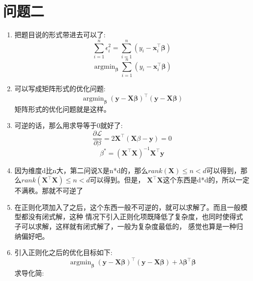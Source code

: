 \documentclass[answers]{exam}  %
\def \x \mathbf{x}
\def\x{{\boldsymbol{x}}}
\begin{document}
\section{问题二}
\begin{enumerate}[label=\alph*.] 
    \item 把题目说的形式带进去可以了:
    \begin{equation*}
        \sum_{i=1}^{n} \epsilon_i^2 = \sum_{i=1}^{n} (y_i - \x_i^\top \mathbf{\beta})
    \end{equation*}
    \begin{equation*}
        \mathop{\arg\min}_{\mathbf{\beta}} \sum_{i=1}^{n} (y_i - \x_i^\top \mathbf{\beta})
    \end{equation*}
    \item 可以写成矩阵形式的优化问题:
    \begin{equation*}
        \mathop{\arg\min}_{\mathbf{\beta}} (\mathbf{y} - \mathbf{X} \mathbf{\beta})^\top (\mathbf{y} - \mathbf{X} \mathbf{\beta})
    \end{equation*}
    矩阵形式的优化问题就是这样。
    \item 可逆的话，那么用求导等于0就好了:
    \begin{equation*}
        \frac{\partial \mathcal{L}}{\partial \beta} = 2\mathbf{X}^\top (\mathbf{X}\beta - \mathbf{y}) = 0
    \end{equation*}
    \begin{equation*}
        \beta^* = (\mathbf{X}^\top\mathbf{X})^{-1} \mathbf{X}^\top \mathbf{y}
    \end{equation*}
    \item 因为维度d比n大，第二问说X是n*d的，那么$rank(\mathbf{X})\leq n<d$可以得到，那么$rank(\mathbf{X}^\top \mathbf{X})\leq n<d$可以得到。但是，
    $\mathbf{X}^\top\mathbf{X}$这个东西是d*d的，所以一定不满秩。那就不可逆了
    \item 在正则化项加入了之后，这个东西一般不可逆的，就可以求解了。而且一般模型都没有闭式解，这种
    情况下引入正则化项既降低了复杂度，也同时使得式子可以求解，这样就有闭式解了，一般为复杂度最低的，
    感觉也算是一种归纳偏好吧。
    \item 引入正则化之后的优化目标如下:
    \begin{equation*}
        \mathop{\arg\min}_{\mathbf{\beta}} (\mathbf{y} - \mathbf{X} \mathbf{\beta})^\top (\mathbf{y} - \mathbf{X} \mathbf{\beta}) + \lambda \mathbf{\beta}^\top \mathbf{\beta}
    \end{equation*}
    求导化简:
    \begin{equation*}

\end{equation*}
\end{enumerate}
\end{document}
